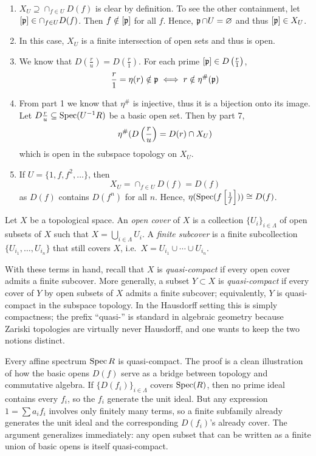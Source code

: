 \documentclass[Notebook.tex]{subfiles}
\begin{document}
\begin{solution}
\begin{enumerate}
        \item $X_U \supseteq \cap_{f \in U}D(f)$ is clear by definition. To see the other containment, let $[\operatorname{\mathfrak{p}}] \in \cap_{f \in U } D(f)$. Then $f \notin [\operatorname{\mathfrak{p}}]$ for all $f$. Hence, $\operatorname{\mathfrak{p}} \cap U = \varnothing$ and thus $[\operatorname{\mathfrak{p}}] \in X_U$. 
        
        \item In this case, $X_U$ is a finite intersection of open sets and thus is open. 
        
        \item We know that $D(\frac{r}{u}) = D(\frac{r}{1})$. For each prime $[\operatorname{\mathfrak{p}}] \in D\left(\frac{r}{1}\right)$, 
        \[\frac{r}{1} = \eta(r) \notin \operatorname{\mathfrak{p}}  \iff r \notin \eta^{\#}(\operatorname{\mathfrak{p}})\]

        \item From part 1 we know that $\eta^{\#}$ is injective, thus it is a bijection onto its image. Let $D\frac{r}{u} \subseteq \operatorname{Spec}(U^{-1}R)$ be a basic open set. Then by part 7, 
        \[\eta^{\#}(D\left(\frac{r}{u}\right) = D(r) \cap X_U)\]
        which is open in the subspace topology on $X_U$.

        \item If $U = \{1, f, f^2, \ldots\}$, then 
        \[X_U = \cap_{f \in U}D(f) = D(f)\]
        as $D(f)$ contains $D(f^n)$ for all $n$. Hence, $\eta(\operatorname{Spec}(f \left[\frac{1}{f}\right])) \cong D(f)$. 
    \end{enumerate}
\end{solution}

\newpage


\hrulefill

Let $X$ be a topological space. An \emph{open cover} of $X$ is a collection $\{U_i\}_{i \in \Lambda}$ of open subsets of $X$ such that $X = \bigcup_{i \in \Lambda} U_i$. A \emph{finite subcover} is a finite subcollection $\{U_{i_1}, \dots, U_{i_n}\}$ that still covers $X$, i.e.\ $X = U_{i_1} \cup \cdots \cup U_{i_n}$.
 
With these terms in hand, recall that $X$ is \emph{quasi-compact} if every open cover admits a finite subcover. More generally, a subset $Y \subset X$ is \emph{quasi-compact} if every cover of $Y$ by open subsets of $X$ admits a finite subcover; equivalently, $Y$ is quasi-compact in the subspace topology. In the Hausdorff setting this is simply compactness; the prefix ``quasi-'' is standard in algebraic geometry because Zariski topologies are virtually never Hausdorff, and one wants to keep the two notions distinct.
 
 Every affine spectrum $\operatorname{Spec} R$ is quasi-compact. The proof is a clean illustration of how the basic opens $D(f)$ serve as a bridge between topology and commutative algebra. If $\{D(f_i)\}_{i \in \Lambda}$ covers $\operatorname{Spec}(R)$, then no prime ideal contains every $f_i$, so the $f_i$ generate the unit ideal. But any expression $1 = \sum a_i f_i$ involves only finitely many terms, so a finite subfamily already generates the unit ideal and the corresponding $D(f_i)$'s already cover. The argument generalizes immediately: any open subset that can be written as a finite union of basic opens is itself quasi-compact.
  
\end{document}
